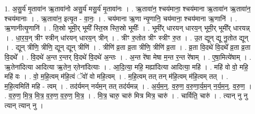 \documentclass[17pt]{extarticle}
\begin{document}
1. अ॒सु॒र्य॑ मृ॒तावा॑न ऋ॒तावा॑नो असु॒र्य॑ मसु॒र्य॑ मृ॒तावा॑नः । . ऋ॒तावा॑न॒ श्चय॑माना॒ श्चय॑माना ऋ॒तावा॑न ऋ॒तावा॑न॒ श्चय॑मानाः । . ऋ॒तावा॑न॒ इत्यृ॒त - वा॒नः॒ । . चय॑माना ऋ॒णा न्यृ॒णानि॒ चय॑माना॒ श्चय॑माना ऋ॒णानि॑ । . ऋ॒णानीत्यृ॒णानि॑ । . ति॒स्रो भूमी॒र् भूमी᳚ स्ति॒स्र स्ति॒स्रो भूमीः᳚ । . भूमी᳚र् धारयन् धारय॒न् भूमी॒र् भूमी᳚र् धारयन्न् । . धा॒र॒य॒न् त्रीꣳ स्त्रीन् धा॑रयन् धारय॒न् त्रीन् । . त्रीꣳ रु॒तोत त्रीꣳ स्त्रीꣳ रु॒त । . उ॒त द्यून् द्यू नु॒तोत द्यून् । . द्यून् त्रीणि॒ त्रीणि॒ द्यून् द्यून् त्रीणि॑ । . त्रीणि॑ व्र॒ता व्र॒ता त्रीणि॒ त्रीणि॑ व्र॒ता । . व्र॒ता वि॒दथे॑ वि॒दथे᳚ व्र॒ता व्र॒ता वि॒दथे᳚ । . वि॒दथे॑ अ॒न्त र॒न्तर् वि॒दथे॑ वि॒दथे॑ अ॒न्तः । . अ॒न्त रे॑षा मेषा म॒न्त र॒न्त रे॑षाम् । . ए॒षा॒मित्ये॑षाम् । . ऋ॒तेना॑दित्या आदित्या ऋ॒तेन॒ र्‌तेना॑दित्याः । . आ॒दि॒त्या॒ महि॒ मह्या॑दित्या आदित्या॒ महि॑ । . महि॑ वो वो॒ महि॒ महि॑ वः । . वो॒ म॒हि॒त्वम् म॑हि॒त्वं ॅवो॑ वो महि॒त्वम् । . म॒हि॒त्वम् तत् तन् म॑हि॒त्वम् म॑हि॒त्वम् तत् । . म॒हि॒त्वमिति॑ महि - त्वम् । . तद॑र्यमन् नर्यम॒न् तत् तद॑र्यमन्न् । . अ॒र्य॒म॒न्॒. व॒रु॒ण॒ व॒रु॒णा॒र्य॒म॒न् न॒र्य॒म॒न्॒. व॒रु॒ण॒ । . व॒रु॒ण॒ मि॒त्र॒ मि॒त्र॒ व॒रु॒ण॒ व॒रु॒ण॒ मि॒त्र॒ । . मि॒त्र॒ चारु॒ चारु॑ मित्र मित्र॒ चारु॑ । . चार्विति॒ चारु॑ । . त्यान् नु नु त्यान् त्यान् नु । \newline
\end{document}
